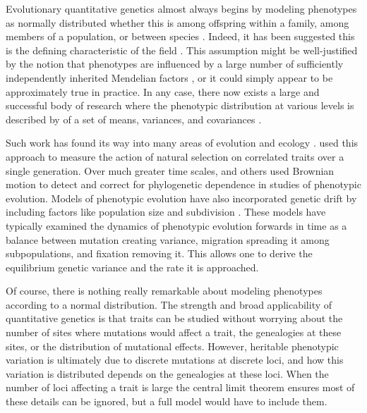 Evolutionary quantitative genetics almost always begins by modeling phenotypes
as normally distributed whether this is among offspring within a family, among
members of a population, or between species \citep{Turelli2017}. Indeed, it has
been suggested this is the defining characteristic of the
field \citep{Rice2004}. This assumption might be well-justified by the notion
that phenotypes are influenced by a large number of sufficiently independently
inherited Mendelian factors \citep{Fisher1918}, or it could simply appear to be
approximately true in practice. In any case, there now exists a large and
successful body of research where the phenotypic distribution at various levels is
described by of a set of means, variances, and covariances \citep{Falconer1996}.

Such work has found its way into many areas of evolution and
ecology \citep{Walsh2013,Kruuk2004}. \citet{Lande1983} used this approach to
measure the action of natural selection on correlated traits over a single
generation. Over much greater time scales, \citet{Freckleton2002} and others
used Brownian motion to detect and correct for phylogenetic dependence in
studies of phenotypic evolution. Models of phenotypic evolution have also
incorporated genetic drift by including factors like population size and
subdivision \citep{Chakraborty1982,Lynch1986,Lande1992}. These models have
typically examined the dynamics of phenotypic evolution forwards in time as a
balance between mutation creating variance, migration spreading it among
subpopulations, and fixation removing it. This allows one to derive the
equilibrium genetic variance and the rate it is approached.

Of course, there is nothing really remarkable about modeling phenotypes
according to a normal distribution. The strength and broad applicability of
quantitative genetics is that traits can be studied without worrying about the
number of sites where mutations would affect a trait, the genealogies at these
sites, or the distribution of mutational effects. However, heritable phenotypic
variation is ultimately due to discrete mutations at discrete loci, and how this
variation is distributed depends on the genealogies at these loci. When the
number of loci affecting a trait is large the central limit theorem ensures
most of these details can be ignored, but a full model would have to include
them.


